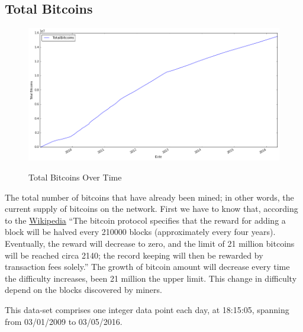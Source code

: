 \clearpage

\subsection{Total Bitcoins}
\label{sec:total-bitcoins}

\begin{figure}[bth]
  \myfloatalign
  {\includegraphics[width=1\linewidth]
    {gfx/total-bitcoins-over-time}}
  \caption{Total Bitcoins
    Over Time}
  \label{fig:total-bitcoins-over-time}
\end{figure}

The total number of bitcoins that have already been mined; in other
words, the current supply of bitcoins on the network. First we have to
know that, according to the \href{}{Wikipedia} ``The bitcoin protocol
specifies that the reward for adding a block will be halved every
210000 blocks (approximately every four years). Eventually, the reward
will decrease to zero, and the limit of 21 million bitcoins will be
reached circa 2140; the record keeping will then be rewarded by
transaction fees solely.'' The growth of bitcoin amount will decrease
every time the difficulty increases, been 21 million the upper limit.
This change in difficulty depend on the blocks discovered by miners.

This data-set comprises one integer data point each day, at 18:15:05,
spanning from 03/01/2009 to 03/05/2016.

